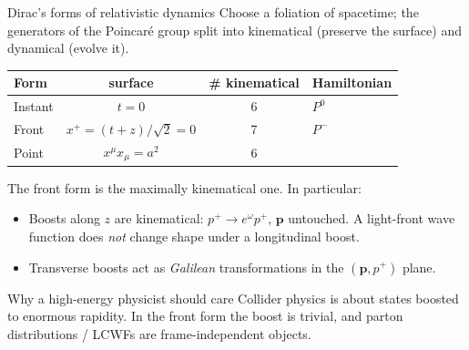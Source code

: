 \documentclass[9pt,aspectratio=169]{beamer}
\newcommand{\hl}[1]{\textcolor{acc}{#1}}
\newcommand{\hb}[1]{\textcolor{blu}{#1}}
\newcommand{\xp}{x^{+}}
\begin{document}
\begin{frame}{Dirac's forms of relativistic dynamics}
Choose a foliation of spacetime; the generators of the Poincar\'e group split into
\hb{kinematical} (preserve the surface) and \hl{dynamical} (evolve it).
\medskip
\begin{center}
\small
\begin{tabular}{lccl}
\toprule
Form & surface & \# kinematical & Hamiltonian\\
\midrule
Instant & $t=0$ & 6 & $P^{0}$\\
\hl{Front} & $\xp=(t+z)/\sqrt2=0$ & \hl{7} & $P^{-}$\\
Point & $x^\mu x_\mu = a^2$ & 6 & \\
\bottomrule
\end{tabular}
\end{center}
\medskip
The front form is the \hl{maximally kinematical} one. In particular:
\begin{itemize}
  \item \hb{Boosts along $z$ are kinematical}: $p^{+}\!\to e^{\omega}p^{+}$, $\bm{p}$ untouched.
        A light-front wave function does \emph{not} change shape under a longitudinal boost.
  \item Transverse boosts act as \emph{Galilean} transformations in the $(\bm p, p^+)$ plane.
\end{itemize}
\medskip
\begin{block}{Why a high-energy physicist should care}
Collider physics is about states boosted to enormous rapidity. In the front form
the boost is trivial, and \hl{parton distributions / LCWFs are frame-independent objects}.
\end{block}
\end{frame}
\end{document}
